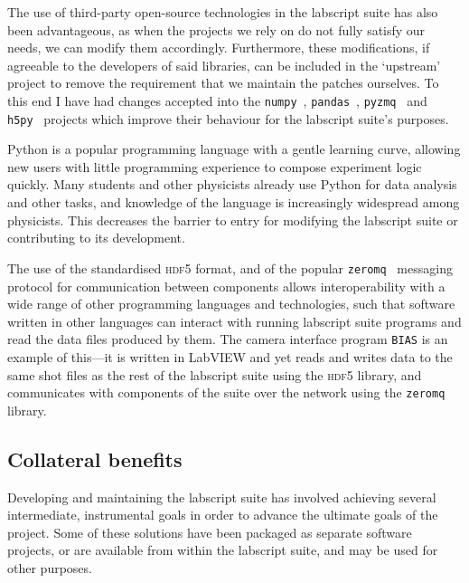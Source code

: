 The use of third-party open-source technologies in the labscript suite has also been advantageous, as when the projects we rely on do not fully satisfy our needs, we can modify them accordingly. Furthermore, these modifications, if agreeable to the developers of said libraries, can be included in the `upstream' project to remove the requirement that we maintain the patches ourselves. To this end I have had changes accepted into the \texttt{numpy}~\cite{oliphant_guide_2015}, \texttt{pandas}~\cite{mckinney-proc-scipy-2010}, \texttt{pyzmq}~\cite{brian_e._granger_and_contributors_pyzmq_2018} and \texttt{h5py}~\cite{andrew_collette_and_contributors_h5py_2018} projects which improve their behaviour for the labscript suite's purposes. 

Python is a popular programming language with a gentle learning curve, allowing new users with little programming experience to compose experiment logic quickly. Many students and other physicists already use Python for data analysis and other tasks, and knowledge of the language is increasingly widespread among physicists. This decreases the barrier to entry for modifying the labscript suite or contributing to its development.

The use of the standardised \textsc{hdf5} format, and of the popular \texttt{zeromq}~\cite{zeromq_guide} messaging protocol for communication between components allows interoperability with a wide range of other programming languages and technologies, such that software written in other languages can interact with running labscript suite programs and read the data files produced by them. The camera interface program \texttt{BIAS} is an example of this---it is written in LabVIEW and yet reads and writes data to the same shot files as the rest of the labscript suite using the \textsc{hdf5} library, and communicates with components of the suite over the network using the \texttt{zeromq} library.


\subsection{Collateral benefits}

Developing and maintaining the labscript suite has involved achieving several intermediate, instrumental goals in order to advance the ultimate goals of the project. Some of these solutions have been packaged as separate software projects, or are available from within the labscript suite, and may be used for other purposes.

